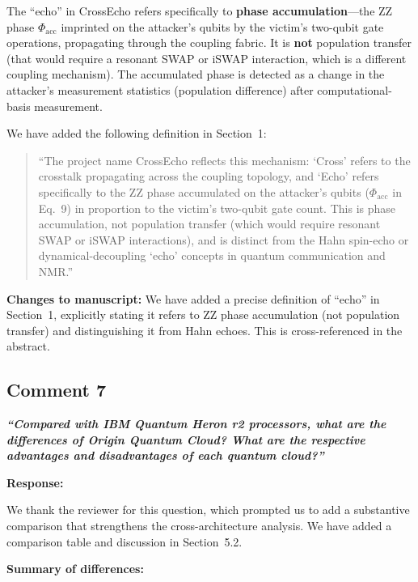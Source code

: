 \documentclass[11pt,a4paper]{article}
\begin{document}
The ``echo'' in CrossEcho refers specifically to \textbf{phase accumulation}---the ZZ phase
$\Phi_{\mathrm{acc}}$ imprinted on the attacker's qubits by the victim's two-qubit gate
operations, propagating through the coupling fabric. It is \textbf{not} population transfer
(that would require a resonant SWAP or iSWAP interaction, which is a different coupling
mechanism). The accumulated phase is detected as a change in the attacker's measurement
statistics (population difference) after computational-basis measurement.

We have added the following definition in Section~1:
\begin{quote}
\small
``The project name CrossEcho reflects this mechanism: `Cross' refers to the crosstalk
propagating across the coupling topology, and `Echo' refers specifically to the ZZ phase
accumulated on the attacker's qubits ($\Phi_{\mathrm{acc}}$ in Eq.~9) in proportion to the
victim's two-qubit gate count. This is phase accumulation, not population transfer (which
would require resonant SWAP or iSWAP interactions), and is distinct from the Hahn
spin-echo or dynamical-decoupling `echo' concepts in quantum communication and NMR.''
\end{quote}

\medskip\noindent\textbf{Changes to manuscript:} We have added a precise definition of
``echo'' in Section~1, explicitly stating it refers to ZZ phase accumulation (not
population transfer) and distinguishing it from Hahn echoes. This is cross-referenced in
the abstract.

\subsection*{Comment 7}

\noindent\textbf{\textit{``Compared with IBM Quantum Heron r2 processors, what are the
differences of Origin Quantum Cloud? What are the respective advantages and disadvantages
of each quantum cloud?''}}

\medskip\noindent\textbf{Response:}

We thank the reviewer for this question, which prompted us to add a substantive comparison
that strengthens the cross-architecture analysis. We have added a comparison table and
discussion in Section~5.2.

\medskip\noindent\textbf{Summary of differences:}
\end{document}

